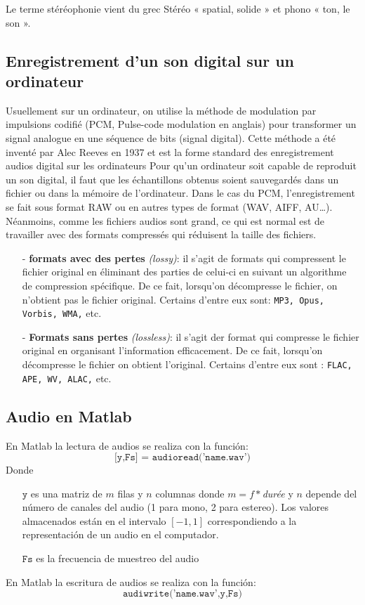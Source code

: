 \documentclass[conference,onecolumn]{IEEEtran}
\begin{document}
Le terme stéréophonie vient du grec Stéréo « spatial, solide » et phono « ton, le son ».

\subsection{Enregistrement d'un son digital sur un ordinateur}
Usuellement sur un ordinateur, on utilise la méthode de modulation par impulsions codifié (PCM, Pulse-code modulation en anglais) pour transformer un signal analogue en une séquence de bits (signal digital). Cette méthode a été inventé par Alec Reeves en 1937 et est la forme standard des enregistrement audios digital sur les ordinateurs
Pour qu’un ordinateur soit capable de reproduit un son digital, il faut que les échantillons obtenus soient sauvegardés dans un fichier ou dans la mémoire de l’ordinateur. Dans le cas du PCM, l’enregistrement se fait sous format RAW ou en autres types de format (WAV, AIFF, AU…). Néanmoins, comme les fichiers audios sont grand, ce qui est normal est de travailler avec des formats compressés qui réduisent la taille des fichiers.

\begin{itemize} %

    \item[-] \textbf{formats avec des pertes} \textit{(lossy)}:  il s’agit de formats qui compressent le fichier original en éliminant des parties de celui-ci en suivant un algorithme de compression spécifique. De ce fait, lorsqu’on décompresse le fichier, on n’obtient pas le fichier original. Certains d’entre eux sont: \texttt{MP3, Opus, Vorbis, WMA,} etc.
    \item[-] \textbf{Formats sans pertes} \textit{(lossless)}: il s’agit der format qui compresse le fichier original en organisant l’information efficacement. De ce fait, lorsqu’on décompresse le fichier on obtient l’original. Certains d’entre eux sont : \texttt{FLAC, APE, WV, ALAC,} etc.

\end{itemize}

\subsection{Audio en Matlab}
En Matlab la lectura de audios se realiza con la función:
\[\texttt{[y,Fs] = audioread('name.wav')}\]
Donde
\begin{itemize}
    \item[] $\texttt{y}$ es una matriz de $m$ filas y $n$ columnas donde $m=f*$\textit{durée} y $n$ depende del número de canales del audio (1 para mono, 2 para estereo). Los valores almacenados están en el intervalo $[-1,1]$ correspondiendo a la representación de un audio en el computador.
    \item[] $\texttt{Fs}$ es la frecuencia de muestreo del audio
\end{itemize}
En Matlab la escritura de audios se realiza con la función:
\[\texttt{audiwrite('name.wav',y,Fs)}\]
\end{document}
